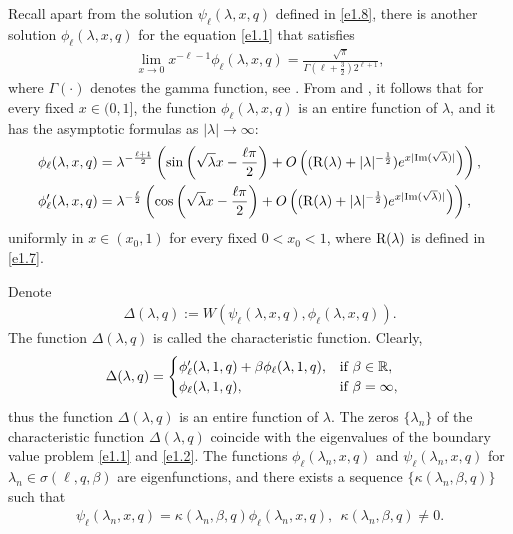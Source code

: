 \documentclass[reqno,12pt,centertags]{amsart}
\numberwithin{equation}{section}
\theoremstyle{definition}
\begin{document}
Recall apart from the solution $\psi_{\ell}(\lambda, x, q)$ defined in \eqref{e1.8}, there is another solution $\phi_{\ell}(\lambda, x, q)$ for the equation \eqref{e1.1} that satisfies 
\begin{align*}
\lim_{x \rightarrow 0} x^{-\ell-1} \phi_{\ell}(\lambda, x, q)=\frac{\sqrt{\pi}}{\Gamma\left(\ell+\frac{3}{2}\right)2^{\ell+1}},
\end{align*}
where $\Gamma(\cdot)$ denotes the gamma function, see \cite{KST2010}. 
From \cite[Lemma 2.2]{KST2010} and \cite[(9.2.5) and (9.2.11)]{Abra1972}, it follows that for every fixed $x\in (0,1]$, the function $\phi_{\ell}(\lambda, x, q)$ is an entire function of $\lambda$, and it has the asymptotic formulas as $|\lambda| \rightarrow \infty$: 
\begin{align}
\phi_{\ell}(\lambda, x, q)
&=\lambda^{-\frac{\ell+1}{2}}
\left(\sin \left(\sqrt{\lambda} x-\frac{\ell \pi}{2}\right)+O\left((\textnormal{R}(\lambda)+|\lambda|^{-\frac{1}{2}}) e^{x| \textnormal{Im}(\sqrt{\lambda}) \mid}\right)\right),\label{e1.5}\\
\phi_{\ell}^{\prime}(\lambda, x, q)
&=\lambda^{-\frac{\ell}{2}}
\left(\cos \left(\sqrt{\lambda} x-\frac{\ell \pi}{2}\right)+O\left((\textnormal{R}(\lambda)+|\lambda|^{-\frac{1}{2}}) e^{x|\textnormal{Im}(\sqrt{\lambda})|}\right)\right),\label{e1.6}
\end{align}
uniformly in $x\in(x_0,1)$ for every fixed $0<x_0<1$, where $\textnormal{R}(\lambda)$ is defined in \eqref{e1.7}. 

Denote
\begin{align*}
\Delta(\lambda, q)
:=W(\psi_{\ell}(\lambda, x, q), \phi_{\ell}(\lambda, x, q)).
\end{align*}
The function $\Delta(\lambda, q)$ is called the characteristic function.
Clearly,
\begin{align*}
\Delta(\lambda, q)
&=
\begin{cases}
\phi_{\ell}^{\prime}(\lambda, 1, q)+\beta\phi_{\ell}(\lambda, 1, q), 
&\textnormal{if}~\beta\in\mathbb{R}, \\
\phi_{\ell}(\lambda, 1, q), 
&\textnormal{if}~\beta=\infty,
\end{cases}
\end{align*}
thus the function $\Delta(\lambda, q)$ is an entire function of $\lambda$. The zeros $\{\lambda_n\}$ of the characteristic function $\Delta(\lambda, q)$ coincide with the eigenvalues of the boundary value problem \eqref{e1.1} and \eqref{e1.2}. The functions $\phi_{\ell}(\lambda_n, x, q)$ and $\psi_{\ell}(\lambda_n, x, q)$ for $\lambda_n\in \sigma(\ell, q, \beta)$ are eigenfunctions, and there exists a sequence $\{\kappa(\lambda_n, \beta, q)\}$ such that
\begin{align}\label{V1}
\psi_{\ell}(\lambda_n, x, q)
=\kappa(\lambda_n, \beta, q)\phi_{\ell}(\lambda_n, x, q), ~~\kappa(\lambda_n, \beta, q) \neq 0.
\end{align}
\end{document}
